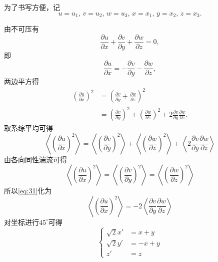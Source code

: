 \documentclass[12pt,a4]{ctexart}
\begin{document}
为了书写方便，记
\begin{equation}
   u = u_1,\, v = u_2,\, w = u_3,\, x = x_1,\, y = x_2,\, z = x_3.
\end{equation}

由不可压有
\begin{equation}
   \frac{\partial u}{\partial x} + \frac{\partial v}{\partial y} + \frac{\partial w}{\partial z} = 0,
\end{equation}
即
\begin{equation}
   \frac{\partial u}{\partial x} = - \frac{\partial v}{\partial y} - \frac{\partial w}{\partial z},
\end{equation}
两边平方得
\begin{equation}
   \begin{aligned}
	  \left( \frac{\partial u}{\partial x} \right)^2 & =  \left( \frac{\partial v}{\partial y} + \frac{\partial w}{\partial z} \right)^2                                                                                   \\
													 & = \left( \frac{\partial v}{\partial y}  \right)^2 + \left( \frac{\partial w}{\partial z}  \right)^2 + 2\frac{\partial v}{\partial y} \frac{\partial w}{\partial z}.
   \end{aligned}
\end{equation}
取系综平均可得
\begin{equation}
   \left< \left( \frac{\partial u}{\partial x} \right)^2 \right> = \left<\left( \frac{\partial v}{\partial y}  \right)^2 \right> + \left<\left( \frac{\partial w}{\partial z}  \right)^2 \right> + \left<2\frac{\partial v}{\partial y} \frac{\partial w}{\partial z}
   \right>
   \label{eq:31}
\end{equation}
由各向同性湍流可得\cite{10.2307/96557}
\begin{equation}
   \left< \left( \frac{\partial u}{\partial x} \right)^2 \right> =\left< \left( \frac{\partial v}{\partial y} \right)^2 \right> =\left< \left( \frac{\partial w}{\partial z} \right)^2 \right>
\end{equation}
所以\cref{eq:31}化为
\begin{equation}
   \left< \left( \frac{\partial u}{\partial x} \right)^2 \right> = -2 \left<\frac{\partial v}{\partial y} \frac{\partial w}{\partial z}
   \right>
\end{equation}
对坐标进行$45^{\circ}$可得
\begin{equation}
   \begin{cases}
	  \sqrt{2} x' & = x + y  \\
	  \sqrt{2} y' & = -x + y \\
	  z' & = z
   \end{cases}
   \label{eq:32}
\end{equation}
\end{document}
